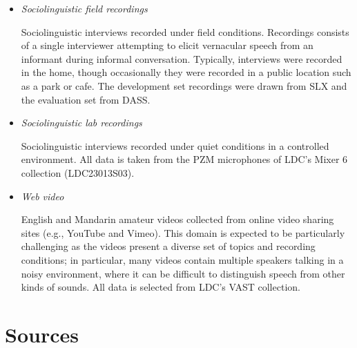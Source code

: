 \begin{itemize}
	\item \emph{Sociolinguistic field recordings}
	
	Sociolinguistic interviews recorded under field conditions. Recordings consists of a single interviewer attempting to elicit vernacular speech from an informant during informal conversation. Typically, interviews were recorded in the home, though occasionally they were recorded in a public location such as a park or cafe. The development set recordings were drawn from SLX and the evaluation set from DASS.
	
	\item \emph{Sociolinguistic lab recordings}
	
	Sociolinguistic interviews recorded under quiet conditions in a controlled environment. All data is taken from the PZM microphones of LDC’s Mixer 6 collection (LDC23013S03).
	
	\item \emph{Web video}
	
	English and Mandarin amateur videos collected from online video sharing sites (e.g., YouTube and Vimeo). This domain is expected to be particularly challenging as the videos present a diverse set of topics and recording conditions; in particular, many videos contain multiple speakers talking in a noisy environment, where it can be difficult to distinguish speech from other kinds of sounds. All data is selected from LDC’s VAST collection.

\end{itemize}

\section{Sources}

